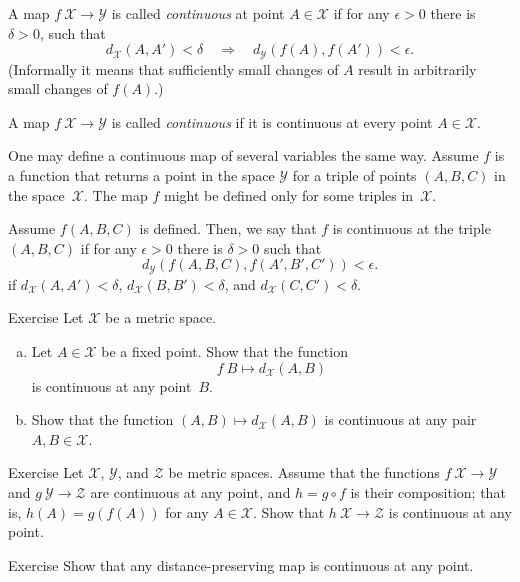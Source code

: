A map $f\:\mathcal X\to\mathcal Y$ is called \emph{continuous} at point $A\in \mathcal X$
if for any $\epsilon>0$ there is $\delta>0$, such that 
\[d_{\mathcal X}(A,A')
<
\delta
\quad
\Rightarrow
\quad
d_{\mathcal Y}(f(A),f(A'))
<
\epsilon.\]
(Informally it means that sufficiently small changes of $A$ result in arbitrarily small changes of $f(A)$.)

A map $f\:\mathcal X\to\mathcal Y$ is called \emph{continuous} if it is continuous at every point $A\in \mathcal X$.

One may define a continuous map of several variables the same way.
Assume $f$ is a function that returns a point in the space $\mathcal Y$ for a triple of points $(A,B,C)$
in the space~$\mathcal X$.
The map $f$ might be defined only for some triples in~$\mathcal X$.

Assume $f(A,B,C)$ is defined.
Then, we say that $f$ is continuous at the triple $(A,B,C)$ 
if for any $\epsilon>0$ there is $\delta>0$ such that 
\[d_{\mathcal Y}(f(A,B,C),f(A',B',C'))<\epsilon.\]
if $d_{\mathcal X}(A,A')<\delta$, $d_{\mathcal X}(B,B')<\delta$, and $d_{\mathcal X}(C,C')<\delta$.


\begin{thm}{Exercise}\label{ex:dist-cont}
Let $\mathcal{X}$ be a metric space.
\begin{enumerate}[(a)]
\item\label{ex:dist-cont:a} Let $A\in \mathcal{X}$ be a fixed point.
Show that the function 
$$f\:B\mapsto
d_{\mathcal{X}}(A,B)$$ 
is continuous at any point~$B$.
\item Show that the function $(A,B)\mapsto d_{\mathcal{X}}(A,B)$ is continuous at any pair $A,B\in \mathcal{X}$.
\end{enumerate}

\end{thm}

\begin{thm}{Exercise}\label{ex:comp+cont}
Let $\mathcal{X}$, $\mathcal{Y}$, and $\mathcal{Z}$ be metric spaces.
Assume that the functions $f\:\mathcal{X}\to\mathcal{Y}$
and $g\:\mathcal{Y}\to\mathcal{Z}$ are continuous at any point,
and $h=g\circ f$ is their composition;
that is, $h(A)=g(f(A))$ for any $A\in \mathcal{X}$.
Show that $h\:\mathcal{X}\to\mathcal{Z}$ is continuous at any point.
\end{thm}

\begin{thm}{Exercise}\label{ex:isom-cont}
Show that any distance-preserving map is continuous at any point.
\end{thm}


